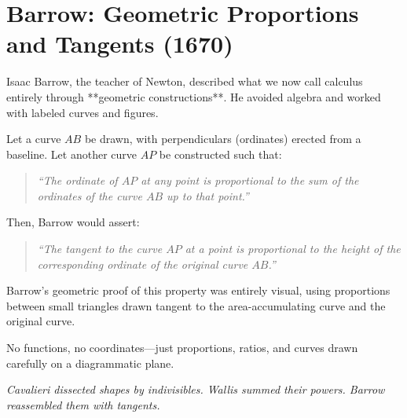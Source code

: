\section{Barrow: Geometric Proportions and Tangents (1670)}

Isaac Barrow, the teacher of Newton, described what we now call calculus entirely through **geometric constructions**. He avoided algebra and worked with labeled curves and figures.

Let a curve \( AB \) be drawn, with perpendiculars (ordinates) erected from a baseline. Let another curve \( AP \) be constructed such that:

\begin{quote}
\textit{“The ordinate of \( AP \) at any point is proportional to the sum of the ordinates of the curve \( AB \) up to that point.”}
\end{quote}

Then, Barrow would assert:

\begin{quote}
\textit{“The tangent to the curve \( AP \) at a point is proportional to the height of the corresponding ordinate of the original curve \( AB \).”}
\end{quote}

Barrow’s geometric proof of this property was entirely visual, using proportions between small triangles drawn tangent to the area-accumulating curve and the original curve.

No functions, no coordinates—just proportions, ratios, and curves drawn carefully on a diagrammatic plane.

\vspace{1em}

\begin{center}
\textit{Cavalieri dissected shapes by indivisibles. Wallis summed their powers. Barrow reassembled them with tangents.}
\end{center}


